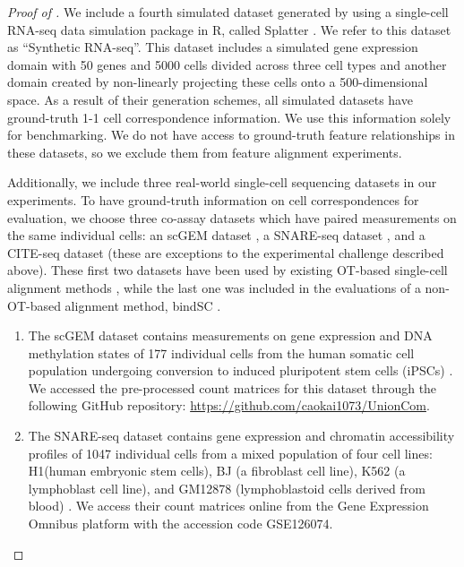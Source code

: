 \begin{proof}[Proof of ]
We include a fourth simulated dataset generated by \citep{Demetci20} using a single-cell RNA-seq
data simulation package in R, called Splatter \citep{zappia2017splatter}.
We refer to this dataset as ``Synthetic RNA-seq''. This dataset includes a simulated gene expression
domain with 50 genes and 5000 cells divided across three cell types and another domain created
by non-linearly projecting these cells onto a 500-dimensional space. As a result of
their generation schemes, all simulated datasets have ground-truth 1-1 cell
correspondence information. We use this information solely for benchmarking.
We do not have access to ground-truth feature relationships in these datasets,
so we exclude them from feature alignment experiments.

Additionally, we include three real-world single-cell sequencing datasets in our experiments.
To have ground-truth information on cell correspondences for evaluation, we choose
three co-assay datasets which have paired measurements on the same individual cells:
an scGEM dataset \citep{cheow2016}, a SNARE-seq dataset \citep{SNAREseq}, and
a CITE-seq dataset \citep{CITEseq} (these are exceptions to the experimental challenge
described above). These first two datasets have been used by existing
OT-based single-cell alignment methods
\citep{cao2020unsupervised, singh20, Demetci20, Pamona, Demetci22},
while the last one was included in the evaluations of a non-OT-based alignment method,
bindSC \citep{bindSC}.
\begin{enumerate}
  \item The scGEM dataset contains measurements on gene expression and
  DNA methylation states of 177 individual cells from the human somatic cell population
  undergoing conversion to induced pluripotent stem cells (iPSCs) \citep{cheow2016}.
  We accessed the pre-processed count matrices for this dataset through the following
  GitHub repository: \url{https://github.com/caokai1073/UnionCom}.

  \item The SNARE-seq dataset contains
  gene expression and chromatin accessibility profiles of 1047 individual cells from
  a mixed population of four cell lines: H1(human embryonic stem cells), BJ (a fibroblast cell line),
  K562 (a lymphoblast cell line), and GM12878 (lymphoblastoid cells derived from blood)
  \citep{SNAREseq}. We access their count matrices online from the Gene Expression Omnibus platform
  with the accession code GSE126074.


\end{enumerate}
\end{proof}

